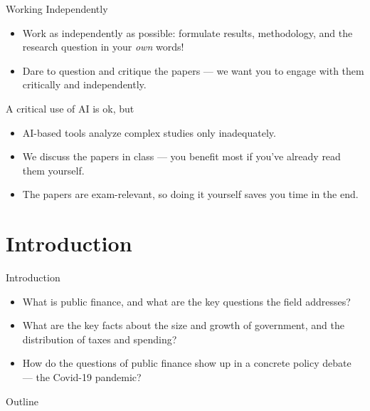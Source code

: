 \documentclass[11pt,aspectratio=169]{beamer}
\begin{document}
	\begin{frame}{Working Independently}
		\begin{itemize}
			\item Work as independently as possible: formulate results, methodology, and the research question in your \emph{own} words!
			\item Dare to question and critique the papers --- we want you to engage with them critically and independently.
		\end{itemize}
		\begin{alertblock}{A critical use of AI is ok, but}
			\begin{itemize}
				\item AI-based tools analyze complex studies only inadequately.
				\item We discuss the papers in class --- you benefit most if you've already read them yourself.
				\item The papers are  exam-relevant, so doing it yourself saves you time in the end.
			\end{itemize}
		\end{alertblock}
	\end{frame}




\section{Introduction}
\begin{frame}{Introduction}
  \begin{itemize}
    \item What is \alert{public finance}, and what are the key questions the field addresses?
    \item What are the key facts about the size and growth of government, and the distribution of taxes and spending?
    \item How do the questions of public finance show up in a concrete policy debate --- the Covid-19 pandemic?
  \end{itemize}
  \vspace{1em}

\end{frame}

\begin{frame}{Outline}
  \tableofcontents
\end{frame}
\end{document}
